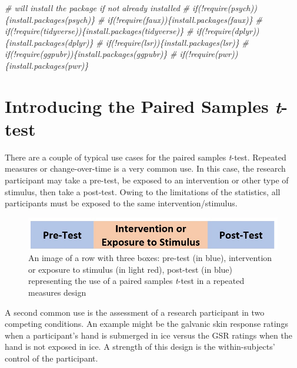 \documentclass[
  11pt,
]{book}
\newenvironment{Shaded}{\begin{snugshade}}{\end{snugshade}}
\newcommand{\CommentTok}[1]{\textcolor[rgb]{0.56,0.35,0.01}{\textit{#1}}}
\begin{document}
\begin{Shaded}
\begin{Highlighting}[]
\CommentTok{\# will install the package if not already installed}
\CommentTok{\# if(!require(psych))\{install.packages(\textquotesingle{}psych\textquotesingle{})\}}
\CommentTok{\# if(!require(faux))\{install.packages(\textquotesingle{}faux\textquotesingle{})\}}
\CommentTok{\# if(!require(tidyverse))\{install.packages(\textquotesingle{}tidyverse\textquotesingle{})\}}
\CommentTok{\# if(!require(dplyr))\{install.packages(\textquotesingle{}dplyr\textquotesingle{})\}}
\CommentTok{\# if(!require(lsr))\{install.packages(\textquotesingle{}lsr\textquotesingle{})\}}
\CommentTok{\# if(!require(ggpubr))\{install.packages(\textquotesingle{}ggpubr\textquotesingle{})\}}
\CommentTok{\# if(!require(pwr))\{install.packages(\textquotesingle{}pwr\textquotesingle{})\}}
\end{Highlighting}
\end{Shaded}

\hypertarget{introducing-the-paired-samples-t-test}{%
\section{\texorpdfstring{Introducing the Paired Samples \emph{t}-test}{Introducing the Paired Samples t-test}}\label{introducing-the-paired-samples-t-test}}

There are a couple of typical use cases for the paired samples \emph{t}-test. Repeated measures or change-over-time is a very common use. In this case, the research participant may take a pre-test, be exposed to an intervention or other type of stimulus, then take a post-test. Owing to the limitations of the statistics, all participants must be exposed to the same intervention/stimulus.

\begin{figure}
\centering
\includegraphics{images/ttests/prepost_paired.jpg}
\caption{An image of a row with three boxes: pre-test (in blue), intervention or exposure to stimulus (in light red), post-test (in blue) representing the use of a paired samples \emph{t}-test in a repeated measures design}
\end{figure}

A second common use is the assessment of a research participant in two competing conditions. An example might be the galvanic skin response ratings when a participant's hand is submerged in ice versus the GSR ratings when the hand is not exposed in ice. A strength of this design is the within-subjects' control of the participant.
\end{document}

